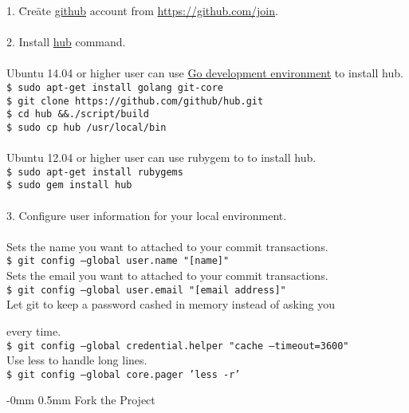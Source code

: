 \documentclass[10pt,landscape]{article}
\makeatletter
\renewcommand{\section}{\@startsection{section}{1}{0mm}%
                                {-0mm} %
                                {0.5mm}%
                                {\normalfont\large\bfseries}}
\makeatother
\begin{document}
\begin{multicols}{2}
\begin{tabbing}
1. \= Cre\=ate \href{http://github.com}{github} account from
\href{https://github.com/join}{https://github.com/join}.\\
\\
2. Install \href{https://github.com/github/hub}{hub} command.\\
\\
\> Ubuntu 14.04 or higher user can use \href{http://golang.org/doc/install}{Go development
  environment} to install hub.\\
\>\> \texttt{\$ sudo apt-get install golang git-core}\\
\>\> \texttt{\$ git clone https://github.com/github/hub.git}\\
\>\> \texttt{\$ cd hub \&\&./script/build}\\
\>\> \texttt{\$ sudo cp hub /usr/local/bin}\\
\\
\> Ubuntu 12.04 or higher user can use rubygem to to install hub.\\
\>\> \texttt{\$ sudo apt-get install rubygems}\\
\>\> \texttt{\$ sudo gem install hub}\\
\\

3. Configure user information for your local environment.\\
\\
\> Sets the name you want to attached to your commit transactions.\\
\>\> \texttt{\$ git config --global user.name "[name]"}\\
\>Sets the email you want to attached to your commit transactions.\\
\>\> \texttt{\$ git config --global user.email "[email address]"}\\
\>Let git to keep a password cashed in memory instead of asking you

every time.\\
\>\> \texttt{\$ git config --global credential.helper "cache --timeout=3600"}\\
\>Use less to handle long lines.\\
\>\> \texttt{\$ git config --global core.pager 'less -r'}\\

\end{tabbing}

\vspace{-2.5mm}
\section{Fork the Project}
\vspace{2.5mm}


\end{multicols}
\end{document}
